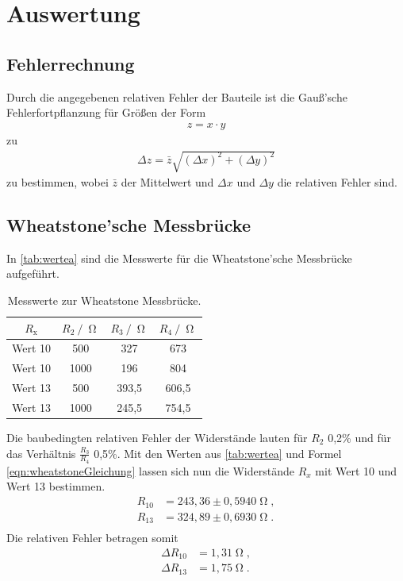 \section{Auswertung}
\label{sec:Auswertung}

\subsection{Fehlerrechnung}
Durch die angegebenen relativen Fehler der Bauteile ist die Gauß'sche Fehlerfortpflanzung für Größen der Form
\begin{align*}
  z = x \cdot y    
\end{align*}
zu
\begin{align*}
  \Delta z = \bar{z}\sqrt{(\Delta x)^2 + (\Delta y)^2}    
\end{align*}
zu bestimmen, wobei $\bar{z}$ der Mittelwert und $\Delta x$ und $\Delta y$ die relativen Fehler sind.


\subsection{Wheatstone'sche Messbrücke}
In \autoref{tab:wertea} sind die Messwerte für die Wheatstone'sche Messbrücke aufgeführt.
\begin{table}[H]
  \centering
  \caption{Messwerte zur Wheatstone Messbrücke.}
  \label{tab:wertea}
  \begin{tabular}{c c c c}
    \toprule
    $R_{\text{x}}$ & $R_{\text{2}} \:/\: \upOmega$ & $R_{\text{3}} \:/\: \upOmega$ & $R_{\text{4}} \:/\: \upOmega$ \\
    \midrule
    Wert 10 & 500 & 327 & 673 \\
    Wert 10 & 1000 & 196 & 804 \\
    Wert 13 & 500 & 393,5 & 606,5 \\
    Wert 13 & 1000 & 245,5 & 754,5 \\
    \bottomrule
  \end{tabular}
\end{table}
Die baubedingten relativen Fehler der Widerstände lauten für $R_2$ 0,2\% und für das Verhältnis $\frac{R_3}{R_4}$ 0,5\%. Mit den Werten aus \autoref{tab:wertea} und
Formel \autoref{eqn:wheatstoneGleichung} lassen sich nun die Widerstände $R_x$ mit Wert 10 und Wert 13 bestimmen.
\begin{align*}
  R_{10} &= 243,36 \pm 0,5940 \upOmega, \\
  R_{13} &= 324,89 \pm 0,6930 \upOmega. \\
\end{align*}
Die relativen Fehler betragen somit
\begin{align*}
  \Delta R_{10} &= 1,31 \upOmega , \\
  \Delta R_{13} &= 1,75 \upOmega . \\
\end{align*}

